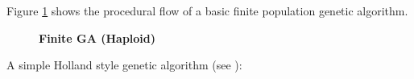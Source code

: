 Figure \ref{FiniteGA} shows the procedural flow of a basic finite population genetic algorithm.
\begin{figure}[H]
\begin{center}
\hspace{4pt}
\caption{\textbf{Finite GA (Haploid)} }
\label{FiniteGA}
\end{center}
\end{figure}

A simple Holland style genetic algorithm (see \cite{Holland1975}):

